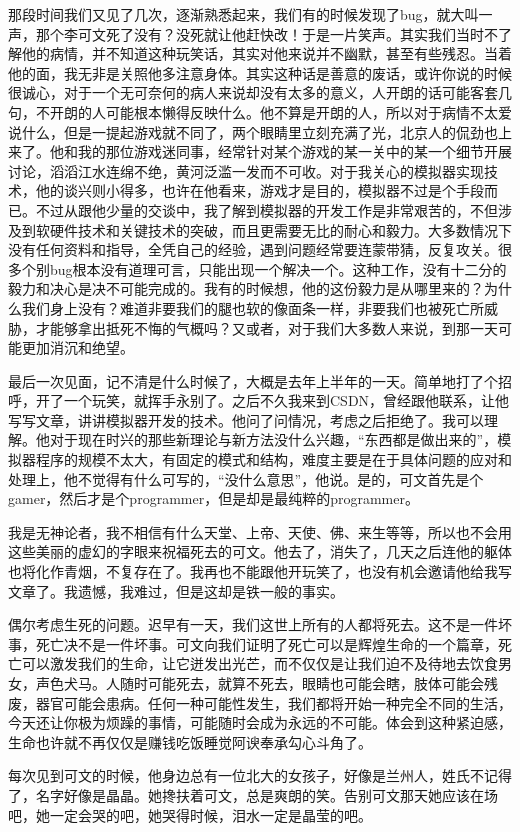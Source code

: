 \documentclass{article}
\begin{document}
那段时间我们又见了几次，逐渐熟悉起来，我们有的时候发现了bug，就大叫一声，那个李可文死了没有？没死就让他赶快改！于是一片笑声。其实我们当时不了解他的病情，并不知道这种玩笑话，其实对他来说并不幽默，甚至有些残忍。当着他的面，我无非是关照他多注意身体。其实这种话是善意的废话，或许你说的时候很诚心，对于一个无可奈何的病人来说却没有太多的意义，人开朗的话可能客套几句，不开朗的人可能根本懒得反映什么。他不算是开朗的人，所以对于病情不太爱说什么，但是一提起游戏就不同了，两个眼睛里立刻充满了光，北京人的侃劲也上来了。他和我的那位游戏迷同事，经常针对某个游戏的某一关中的某一个细节开展讨论，滔滔江水连绵不绝，黄河泛滥一发而不可收。对于我关心的模拟器实现技术，他的谈兴则小得多，也许在他看来，游戏才是目的，模拟器不过是个手段而已。不过从跟他少量的交谈中，我了解到模拟器的开发工作是非常艰苦的，不但涉及到软硬件技术和关键技术的突破，而且更需要无比的耐心和毅力。大多数情况下没有任何资料和指导，全凭自己的经验，遇到问题经常要连蒙带猜，反复攻关。很多个别bug根本没有道理可言，只能出现一个解决一个。这种工作，没有十二分的毅力和决心是决不可能完成的。我有的时候想，他的这份毅力是从哪里来的？为什么我们身上没有？难道非要我们的腿也软的像面条一样，非要我们也被死亡所威胁，才能够拿出抵死不悔的气概吗？又或者，对于我们大多数人来说，到那一天可能更加消沉和绝望。

\newpage

最后一次见面，记不清是什么时候了，大概是去年上半年的一天。简单地打了个招呼，开了一个玩笑，就挥手永别了。之后不久我来到CSDN，曾经跟他联系，让他写写文章，讲讲模拟器开发的技术。他问了问情况，考虑之后拒绝了。我可以理解。他对于现在时兴的那些新理论与新方法没什么兴趣，“东西都是做出来的”，模拟器程序的规模不太大，有固定的模式和结构，难度主要是在于具体问题的应对和处理上，他不觉得有什么可写的，“没什么意思”，他说。是的，可文首先是个gamer，然后才是个programmer，但是却是最纯粹的programmer。

我是无神论者，我不相信有什么天堂、上帝、天使、佛、来生等等，所以也不会用这些美丽的虚幻的字眼来祝福死去的可文。他去了，消失了，几天之后连他的躯体也将化作青烟，不复存在了。我再也不能跟他开玩笑了，也没有机会邀请他给我写文章了。我遗憾，我难过，但是这却是铁一般的事实。

\newpage

偶尔考虑生死的问题。迟早有一天，我们这世上所有的人都将死去。这不是一件坏事，死亡决不是一件坏事。可文向我们证明了死亡可以是辉煌生命的一个篇章，死亡可以激发我们的生命，让它迸发出光芒，而不仅仅是让我们迫不及待地去饮食男女，声色犬马。人随时可能死去，就算不死去，眼睛也可能会瞎，肢体可能会残废，器官可能会患病。任何一种可能性发生，我们都将开始一种完全不同的生活，今天还让你极为烦躁的事情，可能随时会成为永远的不可能。体会到这种紧迫感，生命也许就不再仅仅是赚钱吃饭睡觉阿谀奉承勾心斗角了。

每次见到可文的时候，他身边总有一位北大的女孩子，好像是兰州人，姓氏不记得了，名字好像是晶晶。她搀扶着可文，总是爽朗的笑。告别可文那天她应该在场吧，她一定会哭的吧，她哭得时候，泪水一定是晶莹的吧。
\end{document}
